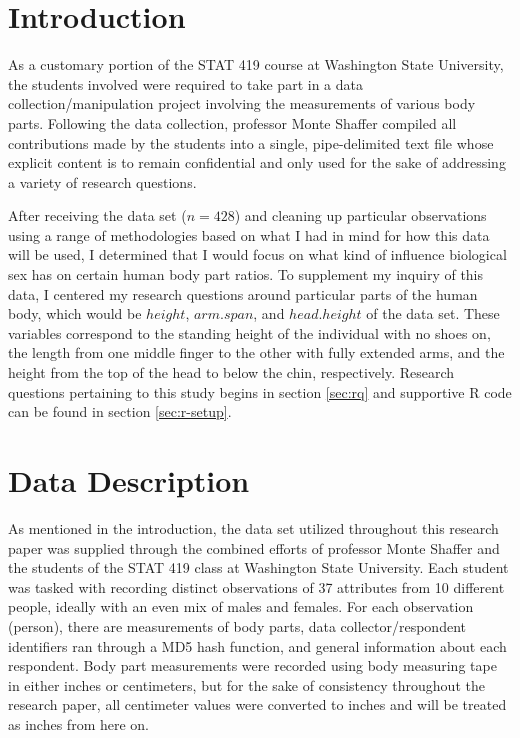 \documentclass[]{article}
\begin{document}
\vskip -8.5pt




\noindent  

\section{Introduction}
\label{sec:intro}

As a customary portion of the STAT 419 course at Washington State
University, the students involved were required to take part in a data
collection/manipulation project involving the measurements of various
body parts. Following the data collection, professor Monte Shaffer
compiled all contributions made by the students into a single,
pipe-delimited text file whose explicit content is to remain
confidential and only used for the sake of addressing a variety of
research questions.

\vspace{0.25cm}

After receiving the data set (\(n=428\)) and cleaning up particular
observations using a range of methodologies based on what I had in mind
for how this data will be used, I determined that I would focus on what
kind of influence biological sex has on certain human body part ratios.
To supplement my inquiry of this data, I centered my research questions
around particular parts of the human body, which would be \(height\),
\(arm.span\), and \(head.height\) of the data set. These variables
correspond to the standing height of the individual with no shoes on,
the length from one middle finger to the other with fully extended arms,
and the height from the top of the head to below the chin, respectively.
Research questions pertaining to this study begins in section
\ref{sec:rq} and supportive R code can be found in section
\ref{sec:r-setup}.

\section{Data Description}
\label{sec:data}

As mentioned in the introduction, the data set utilized throughout this
research paper was supplied through the combined efforts of professor
Monte Shaffer and the students of the STAT 419 class at Washington State
University. Each student was tasked with recording distinct observations
of 37 attributes from 10 different people, ideally with an even mix of
males and females. For each observation (person), there are measurements
of body parts, data collector/respondent identifiers ran through a MD5
hash function, and general information about each respondent. Body part
measurements were recorded using body measuring tape in either inches or
centimeters, but for the sake of consistency throughout the research
paper, all centimeter values were converted to inches and will be
treated as inches from here on.
\end{document}
